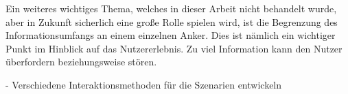 		
		Ein weiteres wichtiges Thema, welches in dieser Arbeit nicht behandelt wurde, aber in Zukunft sicherlich eine große Rolle spielen wird, ist die Begrenzung des Informationsumfangs an einem einzelnen Anker. Dies ist nämlich ein wichtiger Punkt im Hinblick auf das Nutzererlebnis.  Zu viel Information kann den Nutzer überfordern beziehungsweise stören.
		
		
		- Verschiedene Interaktionsmethoden für die Szenarien entwickeln
		
		

